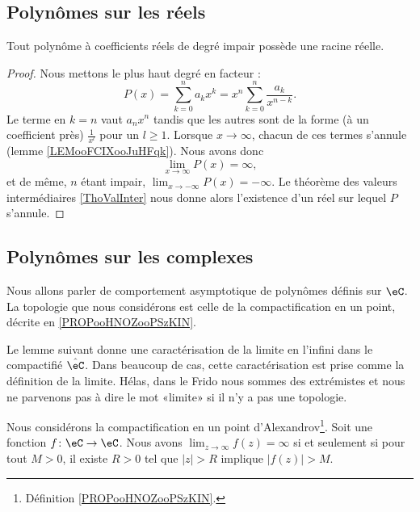 \subsection{Polynômes sur les réels}

\begin{proposition}     \label{PROPooJKYJooFqbQMr}
	Tout polynôme à coefficients réels de degré impair possède une racine réelle.
\end{proposition}

\begin{proof}
	Nous mettons le plus haut degré en facteur :
	\begin{equation}
		P(x)=\sum_{k=0}^na_kx^k=x^n\sum_{k=0}^n\frac{ a_k }{ x^{n-k} }.
	\end{equation}
	Le terme en \( k=n\) vaut \( a_nx^n\) tandis que les autres sont de la forme (à un coefficient près) \( \frac{1}{ x^l }\) pour un \( l\geq 1\). Lorsque \( x\to \infty\), chacun de ces termes s'annule (lemme \ref{LEMooFCIXooJuHFqk}). Nous avons donc
	\begin{equation}
		\lim_{x\to \infty} P(x)=\infty,
	\end{equation}
	et de même, \( n\) étant impair, \( \lim_{x\to -\infty} P(x)=-\infty\). Le théorème des valeurs intermédiaires \ref{ThoValInter} nous donne alors l'existence d'un réel sur lequel \( P\) s'annule.
\end{proof}

\subsection{Polynômes sur les complexes}

Nous allons parler de comportement asymptotique de polynômes définis sur \( \eC\). La topologie que nous considérons est celle de la compactification en un point, décrite en \ref{PROPooHNOZooPSzKIN}.

Le lemme suivant donne une caractérisation de la limite en l'infini dans le compactifié \( \hat \eC\). Dans beaucoup de cas, cette caractérisation est prise comme la définition de la limite. Hélas, dans le Frido nous sommes des extrémistes et nous ne parvenons pas à dire le mot «limite» si il n'y a pas une topologie.
\begin{lemma}        \label{LEMooERABooQjLBzW}
	Nous considérons la compactification en un point d'Alexandrov\footnote{Définition \ref{PROPooHNOZooPSzKIN}.}. Soit une fonction \( f\colon \eC\to \eC\). Nous avons \( \lim_{z\to \infty} f(z)=\infty\) si et seulement si pour tout \( M>0\), il existe \( R>0\) tel que \( | z |>R\) implique \( | f(z) |>M\).
\end{lemma}

